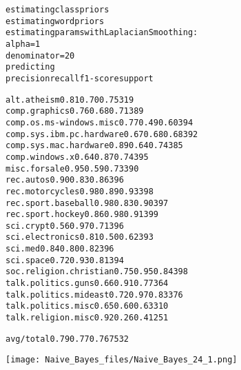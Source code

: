 \documentclass[letterpaper,10pt,english]{/usr/local/lib/python3.4/dist-packages/sphinx/texinputs/sphinxhowto}
\newenvironment{InvisibleVerbatim}
        {\begin{mdframed}[leftmargin=0.1\linewidth,innerleftmargin=3pt,innerrightmargin=3pt, userdefinedwidth=1\linewidth, linewidth=0pt, linecolor=white, usetwoside=false]}
        {\end{mdframed}}
\begin{document}
                \begin{InvisibleVerbatim}
                \vspace{-0.5\baselineskip}
\begin{alltt}estimating class priors
estimating word priors
estimating params with Laplacian Smoothing:
         alpha = 1
         denominator = 20
predicting
                          precision    recall  f1-score   support

             alt.atheism       0.81      0.70      0.75       319
           comp.graphics       0.76      0.68      0.71       389
 comp.os.ms-windows.misc       0.77      0.49      0.60       394
comp.sys.ibm.pc.hardware       0.67      0.68      0.68       392
   comp.sys.mac.hardware       0.89      0.64      0.74       385
          comp.windows.x       0.64      0.87      0.74       395
            misc.forsale       0.95      0.59      0.73       390
               rec.autos       0.90      0.83      0.86       396
         rec.motorcycles       0.98      0.89      0.93       398
      rec.sport.baseball       0.98      0.83      0.90       397
        rec.sport.hockey       0.86      0.98      0.91       399
               sci.crypt       0.56      0.97      0.71       396
         sci.electronics       0.81      0.50      0.62       393
                 sci.med       0.84      0.80      0.82       396
               sci.space       0.72      0.93      0.81       394
  soc.religion.christian       0.75      0.95      0.84       398
      talk.politics.guns       0.66      0.91      0.77       364
   talk.politics.mideast       0.72      0.97      0.83       376
      talk.politics.misc       0.65      0.60      0.63       310
      talk.religion.misc       0.92      0.26      0.41       251

             avg / total       0.79      0.77      0.76      7532

\end{alltt}

            \end{InvisibleVerbatim}
            
                \begin{InvisibleVerbatim}
                \vspace{-0.5\baselineskip}
    \begin{center}
    \texttt{[image: Naive\_Bayes\_files/Naive\_Bayes\_24\_1.png]}
    \par
    \end{center}
    
            \end{InvisibleVerbatim}
            
\end{document}

